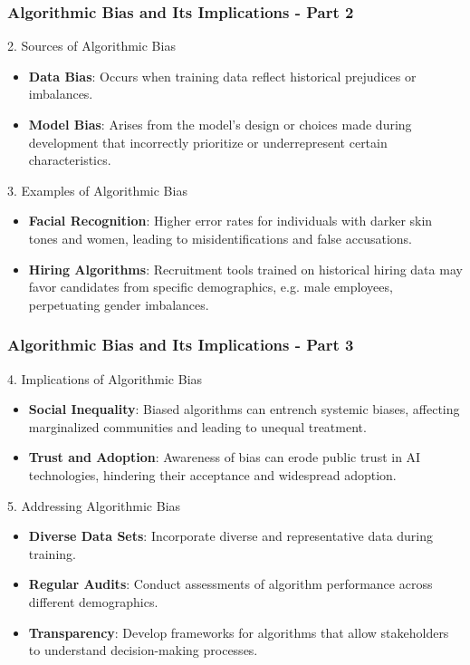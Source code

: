 \documentclass{beamer}
\begin{document}
\begin{frame}[fragile]
    \frametitle{Algorithmic Bias and Its Implications - Part 2}
    \begin{block}{2. Sources of Algorithmic Bias}
        \begin{itemize}
            \item \textbf{Data Bias}: Occurs when training data reflect historical prejudices or imbalances.
            \item \textbf{Model Bias}: Arises from the model’s design or choices made during development that incorrectly prioritize or underrepresent certain characteristics.
        \end{itemize}
    \end{block}

    \begin{block}{3. Examples of Algorithmic Bias}
        \begin{itemize}
            \item \textbf{Facial Recognition}: Higher error rates for individuals with darker skin tones and women, leading to misidentifications and false accusations.
            \item \textbf{Hiring Algorithms}: Recruitment tools trained on historical hiring data may favor candidates from specific demographics, e.g. male employees, perpetuating gender imbalances.
        \end{itemize}
    \end{block}
\end{frame}

\begin{frame}[fragile]
    \frametitle{Algorithmic Bias and Its Implications - Part 3}
    \begin{block}{4. Implications of Algorithmic Bias}
        \begin{itemize}
            \item \textbf{Social Inequality}: Biased algorithms can entrench systemic biases, affecting marginalized communities and leading to unequal treatment.
            \item \textbf{Trust and Adoption}: Awareness of bias can erode public trust in AI technologies, hindering their acceptance and widespread adoption.
        \end{itemize}
    \end{block}

    \begin{block}{5. Addressing Algorithmic Bias}
        \begin{itemize}
            \item \textbf{Diverse Data Sets}: Incorporate diverse and representative data during training.
            \item \textbf{Regular Audits}: Conduct assessments of algorithm performance across different demographics.
            \item \textbf{Transparency}: Develop frameworks for algorithms that allow stakeholders to understand decision-making processes.
        \end{itemize}
    \end{block}
\end{frame}
\end{document}
